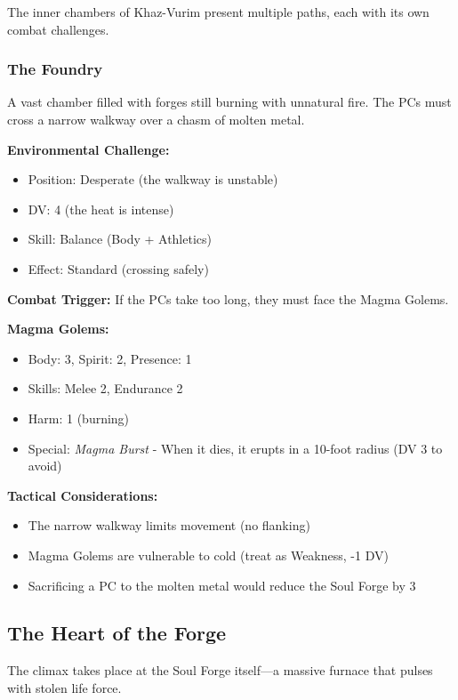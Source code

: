 \documentclass[11pt]{article}
\begin{document}
The inner chambers of Khaz-Vurim present multiple paths, each with its own combat challenges.

\subsubsection{The Foundry}

A vast chamber filled with forges still burning with unnatural fire. The PCs must cross a narrow walkway over a chasm of molten metal.

\textbf{Environmental Challenge:}
\begin{itemize}
    \item Position: Desperate (the walkway is unstable)
    \item DV: 4 (the heat is intense)
    \item Skill: Balance (Body + Athletics)
    \item Effect: Standard (crossing safely)
\end{itemize}

\textbf{Combat Trigger:} If the PCs take too long, they must face the Magma Golems.

\textbf{Magma Golems:}
\begin{itemize}
    \item Body: 3, Spirit: 2, Presence: 1
    \item Skills: Melee 2, Endurance 2
    \item Harm: 1 (burning)
    \item Special: \textit{Magma Burst} - When it dies, it erupts in a 10-foot radius (DV 3 to avoid)
\end{itemize}

\textbf{Tactical Considerations:}
\begin{itemize}
    \item The narrow walkway limits movement (no flanking)
    \item Magma Golems are vulnerable to cold (treat as Weakness, -1 DV)
    \item Sacrificing a PC to the molten metal would reduce the Soul Forge by 3
\end{itemize}

\subsection{The Heart of the Forge}

The climax takes place at the Soul Forge itself---a massive furnace that pulses with stolen life force.
\end{document}
